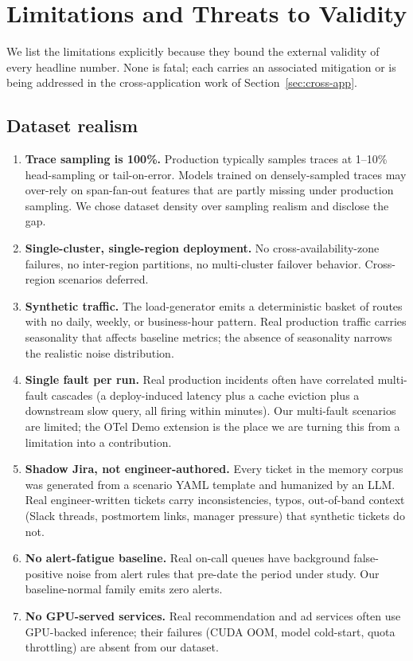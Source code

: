 \section{Limitations and Threats to Validity}
\label{sec:limitations}

We list the limitations explicitly because they bound the external validity of every headline number. None is fatal; each carries an associated mitigation or is being addressed in the cross-application work of Section~\ref{sec:cross-app}.

\subsection{Dataset realism}

\begin{enumerate}
\item \textbf{Trace sampling is 100\%.} Production typically samples traces at 1--10\% head-sampling or tail-on-error. Models trained on densely-sampled traces may over-rely on span-fan-out features that are partly missing under production sampling. We chose dataset density over sampling realism and disclose the gap.

\item \textbf{Single-cluster, single-region deployment.} No cross-availability-zone failures, no inter-region partitions, no multi-cluster failover behavior. Cross-region scenarios deferred.

\item \textbf{Synthetic traffic.} The load-generator emits a deterministic basket of routes with no daily, weekly, or business-hour pattern. Real production traffic carries seasonality that affects baseline metrics; the absence of seasonality narrows the realistic noise distribution.

\item \textbf{Single fault per run.} Real production incidents often have correlated multi-fault cascades (a deploy-induced latency plus a cache eviction plus a downstream slow query, all firing within minutes). Our multi-fault scenarios are limited; the OTel Demo extension is the place we are turning this from a limitation into a contribution.

\item \textbf{Shadow Jira, not engineer-authored.} Every ticket in the memory corpus was generated from a scenario YAML template and humanized by an LLM. Real engineer-written tickets carry inconsistencies, typos, out-of-band context (Slack threads, postmortem links, manager pressure) that synthetic tickets do not.

\item \textbf{No alert-fatigue baseline.} Real on-call queues have background false-positive noise from alert rules that pre-date the period under study. Our baseline-normal family emits zero alerts.

\item \textbf{No GPU-served services.} Real recommendation and ad services often use GPU-backed inference; their failures (CUDA OOM, model cold-start, quota throttling) are absent from our dataset.
\end{enumerate}

